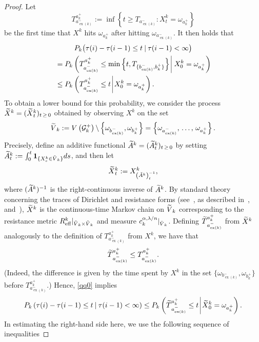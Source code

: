 \documentclass[10pt]{amsart}
\theoremstyle{definition}\newtheorem{defi}[theo]{Definition}\newtheorem{rema}[theo]{Remark}\newtheorem{exam}[theo]{Example}\newtheorem{exem}[theo]{Example}\newtheorem{nota}[theo]{Notation}
\newcommand{\clG}{\mathcal{G}}
\newcommand{\bfun}{\mathbf{1}}
\newcommand{\eff}{\mathrm{eff}}
\newcommand{\Pk}{{P_k}}
\newcommand\ex{\operatorname{ex}}
\newcommand{\aat}[1]{a_{\ex(#1)}^-}
\newcommand{\bt}[1]{b_{\ex(#1)}^-}
\let\oldtilde\tilde
\renewcommand*{\tilde}[1]{\mathchoice{\widetilde{#1}}{\widetilde{#1}}{\oldtilde{#1}}{\oldtilde{#1}}}
\begin{document}
\begin{proof}
Let
\[
T_{\aat{k}}^{a_k^+}:=\inf\left\{t\geq T_{\aat{k}}:X^k_t=\omega_{a_k^+}\right\}
\]
be the first time that $X^k$ hits $\omega_{a_k^+}$ after hitting $\omega_{\aat{k}}$. It then holds that
\begin{multline}\label{qq0}
{\Pk\big(\tau(i)-\tau(i-1)\leq t\:|\:\tau(i-1)<\infty\big)}
\\
\begin{aligned}
&=\Pk\left(T_{\aat{k}}^{a_k^+}\leq \min\left\{t,T_{\{\bt{k},b_k^+\}}\right\}\:\vline\:X^k_0=\omega_{a_k^+}\right)\\
&\leq \Pk\left(T_{\aat{k}}^{a_k^+}\leq t\:\vline\:X^k_0=\omega_{a_k^+}\right).
\end{aligned}
\end{multline}
To obtain a lower bound for this probability, we consider the process $\tilde{X}^k=(\tilde{X}^k_t)_{t\,\geq\,0}$ obtained by observing $X^k$ on the set
\[
\tilde{V}_k:=V\left(\clG_k^+\right)\backslash\left\{\omega_{\bt{k}},\omega_{b_k^+}\right\}=\left\{\omega_{\aat{k}},\,\dots,\,\omega_{a_k^+}\right\}.
\]
Precisely, define an additive functional $\tilde{A}^k=(\tilde{A}^k_t)_{t\,\geq\,0}$ by setting $\tilde{A}^k_t:=\int_0^t\bfun_{
\{X^k_s\in\tilde{V}_k\}}ds$, and then let
\begin{equation}\label{xtildekdef}
\tilde{X}^k_t:=X^k_{\left(\tilde{A}^k\right)^{-1}_t},
\end{equation}
where $(\tilde{A}^k)^{-1}$ is the right-continuous inverse of $\tilde{A}^k$. By standard theory concerning the traces of Dirichlet and resistance forms (see~\cite[Theorem~6.2.1]{FOT}, as described in~\cite[Theorem~4.17]{Barlow}, and~\cite[Theorem~8.4]{Kigami}), $\tilde{X}^k$ is the continuous-time Markov chain on $\tilde{V}_k$ corresponding to the resistance metric $R^k_{\eff}|_{\tilde{V}_k\times \tilde{V}_k}$ and measure $c_k^{\alpha,\lambda/n}|_{\tilde{V}_k}$. Defining $\tilde{T}_{\aat{k}}^{a_k^+}$ from $\tilde{X}^k$ analogously to the definition of $T_{\aat{k}}^{a_k^+}$ from $X^k$, we have that
\[
\tilde{T}_{\aat{k}}^{a_k^+}\leq {T}_{\aat{k}}^{a_k^+}.
\]
(Indeed, the difference is given by the time spent by $X^k$ in the set $\{\omega_{\bt{k}},\omega_{b_k^+}\}$ before {\small${T}_{\aat{k}}^{a_k^+}$.)} Hence, \eqref{qq0} implies
\begin{equation}\label{qq01}
\Pk\left(\tau(i)-\tau(i-1)\leq t\:|\:\tau(i-1)<\infty\right)
\leq \Pk\left(\tilde{T}_{\aat{k}}^{a_k^+}\leq t\:\vline\:\tilde{X}^k_0=\omega_{a_k^+}\right).
\end{equation}
In estimating the right-hand side here, we use the following sequence of inequalities

\end{proof}
\end{document}
